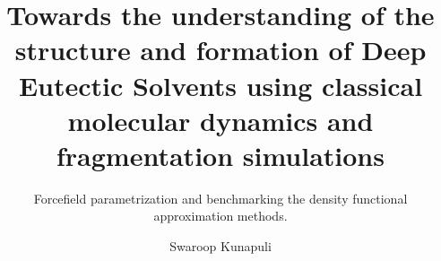 \documentclass{customformat}
\begin{document}
\author{Swaroop Kunapuli}
\title{Towards the understanding of the structure and formation of Deep Eutectic Solvents using classical molecular dynamics and fragmentation simulations}
\subtitle{Forcefield parametrization and benchmarking the density functional approximation methods.}

\maketitle
\newpage
\tableofcontents
\newpage








\end{document}
